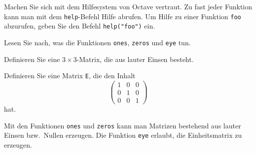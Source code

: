 Machen Sie sich mit dem Hilfesystem von Octave vertraut. Zu fast
jeder Funktion kann man  mit dem {\tt help}-Befehl Hilfe abrufen.
Um Hilfe zu einer Funktion {\tt foo} abzurufen, geben Sie den Befehl
\verb+help("foo")+
ein.
\begin{teilaufgaben}
\item
Lesen Sie nach, was die Funktionen {\tt ones}, {\tt zeros} und {\tt eye}
tun.
\item
Definieren Sie eine $3\times 3$-Matrix, die aus lauter Einsen
besteht.
\item
Definieren Sie eine Matrix {\tt E}, die den Inhalt
\[
\begin{pmatrix}
1&0&0\\
0&1&0\\
0&0&1
\end{pmatrix}
\]
hat.
\end{teilaufgaben}


\begin{loesung}
\begin{teilaufgaben}
\item
Mit den Funktionen {\tt ones} und {\tt zeros} kann man Matrizen
bestehend aus lauter Einsen bzw.~Nullen erzeugen.
Die Funktion {\tt eye} erlaubt, die Einheitsmatrix zu erzeugen.
\item
{}
\item
{}
\end{teilaufgaben}
\end{loesung}


